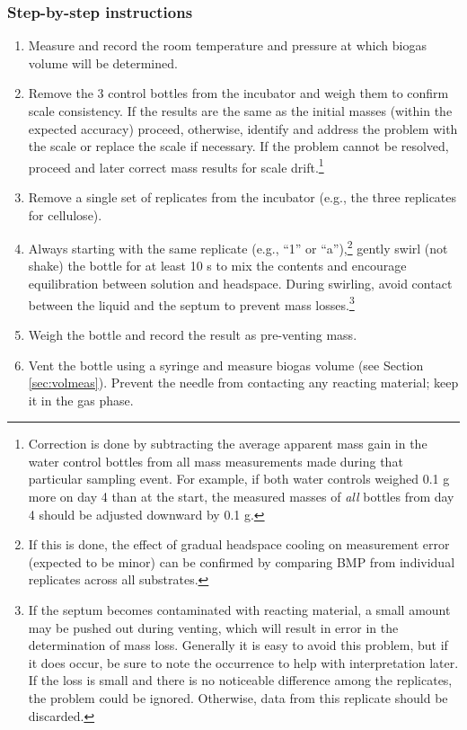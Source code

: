 \documentclass[]{article}
\begin{document}
\subsubsection{Step-by-step instructions} \label{sec:steps}
\begin{enumerate}
    \item Measure and record the room temperature and pressure at which biogas volume will be determined.
    \item Remove the 3 control bottles from the incubator and weigh them to confirm scale consistency. 
      If the results are the same as the initial masses (within the expected accuracy) proceed, otherwise, identify and address the problem with the scale or replace the scale if necessary.
      If the problem cannot be resolved, proceed and later correct mass results for scale drift.\footnote{
        Correction is done by subtracting the average apparent mass gain in the water control bottles from all mass measurements made during that particular sampling event. 
        For example, if both water controls weighed 0.1 g more on day 4 than at the start, the measured masses of \textit{all} bottles from day 4 should be adjusted downward by 0.1 g.
      }
    \item Remove a single set of replicates from the incubator (e.g., the three replicates for cellulose).
    \item Always starting with the same replicate (e.g., ``1'' or ``a''),\footnote{
        If this is done, the effect of gradual headspace cooling on measurement error (expected to be minor) can be confirmed by comparing BMP from individual replicates across all substrates.
      } gently swirl (not shake) the bottle for at least 10 s to mix the contents and encourage  equilibration between solution and headspace. 
      During swirling, avoid contact between the liquid and the septum to prevent mass losses.\footnote{
        If the septum becomes contaminated with reacting material, a small amount may be pushed out during venting, which will result in error in the determination of mass loss.
        Generally it is easy to avoid this problem, but if it does occur, be sure to note the occurrence to help with interpretation later.
        If the loss is small and there is no noticeable difference among the replicates, the problem could be ignored. 
        Otherwise, data from this replicate should be discarded.
      }
    \item Weigh the bottle and record the result as pre-venting mass.
    \item Vent the bottle using a syringe and measure biogas volume (see Section \ref{sec:volmeas}). Prevent the needle from contacting any reacting material; keep it in the gas phase. 

\end{enumerate}
\end{document}
